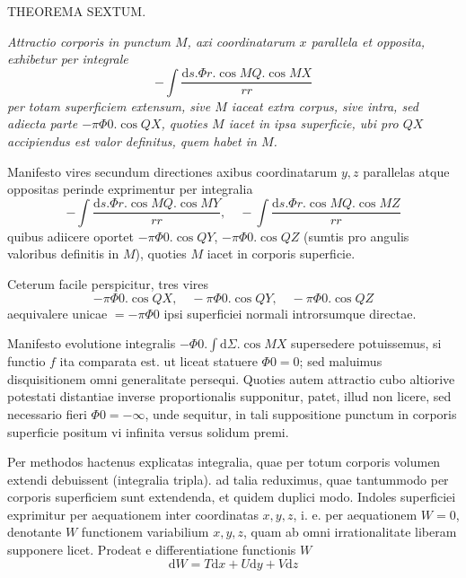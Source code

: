 \par\medskip{}
\centerline{THEOREMA SEXTUM.}\medskip
\par
{\itshape Attractio corporis in punctum $M$, axi coordinatarum $x$ parallela et opposita, exhibetur per integrale
\[
-\int\frac{\mathrm{d}s.\Phi r.\cos MQ.\cos MX}{rr}
\]
per totam superficiem extensum, sive $M$ iaceat extra corpus, sive intra, sed adiecta parte $-\pi\Phi0.\cos QX$, quoties $M$ iacet in ipsa superficie, ubi pro $QX$ accipiendus est valor definitus, quem habet in $M$.}\par
Manifesto vires secundum directiones axibus coordinatarum $y,z$ parallelas atque oppositas perinde exprimentur per integralia
\[
-\int\frac{\mathrm{d}s.\Phi r.\cos MQ.\cos MY}{rr},\quad-\int\frac{\mathrm{d}s.\Phi r.\cos MQ.\cos MZ}{rr}
\]
quibus adiicere oportet $-\pi\Phi0.\cos QY$, $-\pi\Phi0.\cos QZ$ (sumtis pro angulis valoribus definitis in $M$), quoties $M$ iacet in corporis superficie.

Ceterum facile perspicitur, tres vires
\[
-\pi\Phi0.\cos QX,\quad-\pi\Phi0.\cos QY,\quad-\pi\Phi0.\cos QZ
\]
aequivalere unicae $=-\pi\Phi0$ ipsi superficiei normali introrsumque directae.

Manifesto evolutione integralis $-\Phi0.\int\mathrm{d}\Sigma.\cos MX$ supersedere potuissemus, si functio $f$ ita comparata est. ut liceat statuere $\Phi0=0$; sed maluimus disquisitionem omni generalitate persequi. Quoties autem attractio cubo altiorive potestati distantiae inverse proportionalis supponitur, patet, illud non licere, sed necessario fieri $\Phi0=-\infty$, unde sequitur, in tali suppositione punctum in corporis superficie positum vi infinita versus solidum premi.

\par
Per methodos hactenus explicatas integralia, quae per totum corporis volumen extendi debuissent (integralia tripla). ad talia reduximus, quae tantummodo per corporis superficiem sunt extendenda, et quidem duplici modo. Indoles superficiei exprimitur per aequationem inter coordinatas $x,y,z$, i. e. per aequationem $W=0$, denotante $W$ functionem variabilium $x,y,z$, quam ab omni irrationalitate liberam supponere licet. Prodeat e differentiatione functionis $W$
\[
\mathrm{d}W=T\mathrm{d}x+U\mathrm{d}y+V\mathrm{d}z
\]
